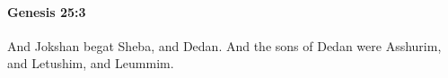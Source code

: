 
		\paragraph{Genesis 25:3} %
			\label{GENESIS-25-3}

			And Jokshan begat Sheba, and Dedan. And the sons of Dedan were Asshurim, and Letushim, and Leummim.


